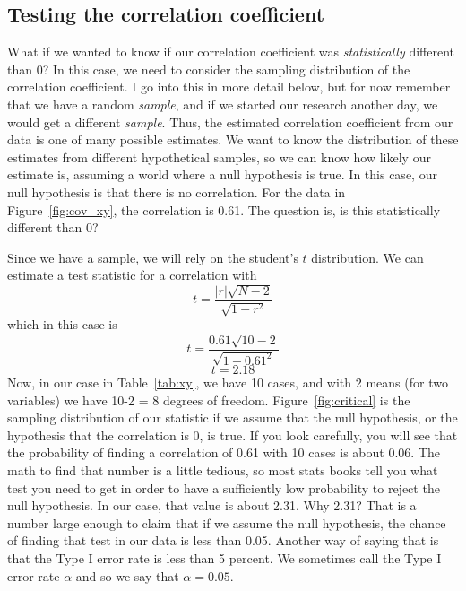 \subsection{Testing the correlation coefficient}
\label{sec:introhypo}
What if we wanted to know if our correlation coefficient was {\it statistically} different than 0? In this case, we need to consider the sampling distribution of the correlation coefficient. I go into this in more detail below, but for now remember that we have a random {\it sample}, and if we started our research another day, we would get a different {\it sample}. Thus, the estimated correlation coefficient from our data is one of many possible estimates. We want to know the distribution of these estimates from different hypothetical samples, so we can know how likely our estimate is, assuming a world where a null hypothesis is true. In this case, our null hypothesis is that there is no correlation. For the data in Figure~\ref{fig:cov_xy}, the correlation is 0.61. The question is, is this statistically different than 0?

Since we have a sample, we will rely on the student's $t$ distribution. We can estimate a test statistic for a correlation with
\begin{equation}
t = \frac{|r|\sqrt{N-2}}{\sqrt{1-r^2}}
\end{equation}
which in this case is
\[
t = \frac{0.61\sqrt{10-2}}{\sqrt{1-0.61^2}}
\]
\[
t = 2.18
\]
Now, in our case in Table~\ref{tab:xy}, we have 10 cases, and with 2 means (for two variables) we have 10-2 = 8 degrees of freedom. Figure~\ref{fig:critical} is the sampling distribution of our statistic if we assume that the null hypothesis, or the hypothesis that the correlation is 0, is true. If you look carefully, you will see that the probability of finding a correlation of 0.61 with 10 cases is about 0.06. The math to find that number is a little tedious, so most stats books tell you what test you need to get in order to have a sufficiently low probability to reject the null hypothesis. In our case, that value is about 2.31. Why 2.31? That is a number large enough to claim that if we assume the null hypothesis, the chance of finding that test in our data is less than 0.05. Another way of saying that is that the Type I error rate is less than 5 percent. We sometimes call the Type I error rate $\alpha$ and so we say that $\alpha = 0.05$.

